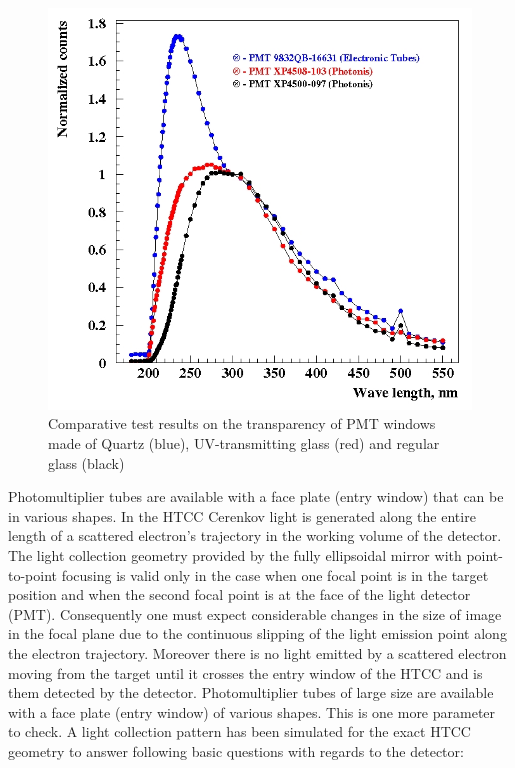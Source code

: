 \begin{figure}[!ht]
    \centering
    \includegraphics[width=1.0\linewidth,trim={1.7cm 0.5cm 0.05cm 0.1cm},clip]{images/Quartz_UV_glass.jpg}
    \caption{Comparative test results on the transparency of PMT windows made of Quartz (blue), UV-transmitting glass (red) and regular glass (black)}
    \label{fig:Quartz_UV_glass}
\end{figure}

Photomultiplier tubes are available with a face plate (entry window) that can be in various shapes. In the HTCC Cerenkov light is generated along the entire length of a scattered electron's trajectory in the working volume of the detector. The light collection geometry provided by the fully ellipsoidal mirror with point-to-point focusing is valid only in the case when one focal point is in the target position and when the second focal point is at the face of the light detector (PMT). Consequently one must expect considerable changes in the size of image in the focal plane due to the continuous slipping of the light emission point along the electron trajectory. Moreover there is no light emitted by a scattered electron moving from the target until it crosses the entry window of the HTCC and is them detected by the detector. Photomultiplier tubes of large size are available with a face plate (entry window) of various shapes. This is one more parameter to check. A light collection pattern has been simulated for the exact HTCC geometry to answer following basic questions with regards to the detector:

